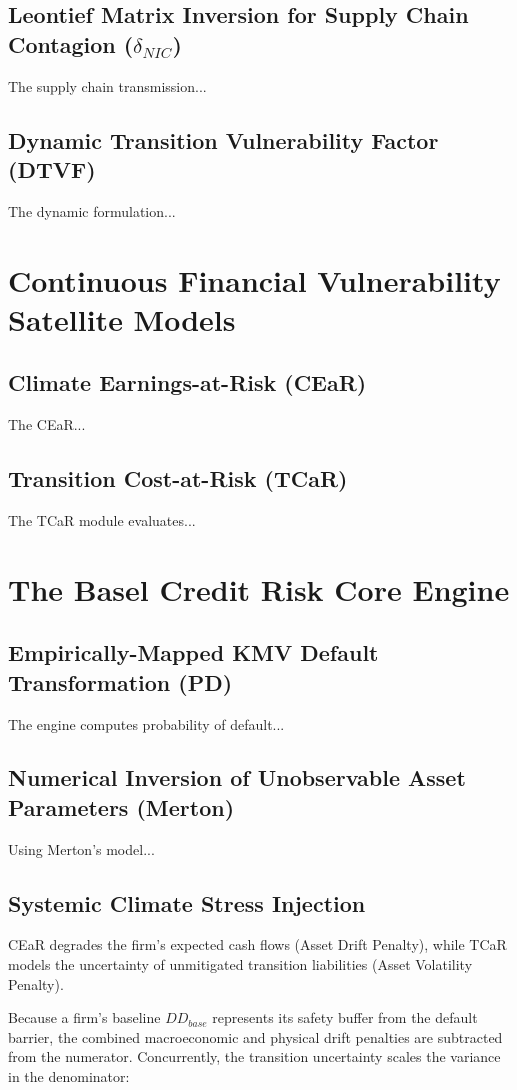 \documentclass[11pt]{article}
\begin{document}
\subsection{Leontief Matrix Inversion for Supply Chain Contagion ($\delta_{NIC}$)}
The supply chain transmission...

\subsection{Dynamic Transition Vulnerability Factor (DTVF)}
The dynamic formulation...

\section{Continuous Financial Vulnerability Satellite Models}
\subsection{Climate Earnings-at-Risk (CEaR)}
The CEaR...

\subsection{Transition Cost-at-Risk (TCaR)}
The TCaR module evaluates...

\section{The Basel Credit Risk Core Engine}
\subsection{Empirically-Mapped KMV Default Transformation (PD)}
The engine computes probability of default...

\subsection{Numerical Inversion of Unobservable Asset Parameters (Merton)}
Using Merton's model...

\subsection{Systemic Climate Stress Injection}
CEaR degrades the firm's expected cash flows (Asset Drift Penalty), while TCaR models the uncertainty of unmitigated transition liabilities (Asset Volatility Penalty).

Because a firm's baseline $DD_{base}$ represents its safety buffer from the default barrier, the combined macroeconomic and physical drift penalties are subtracted from the numerator. Concurrently, the transition uncertainty scales the variance in the denominator:
\end{document}
